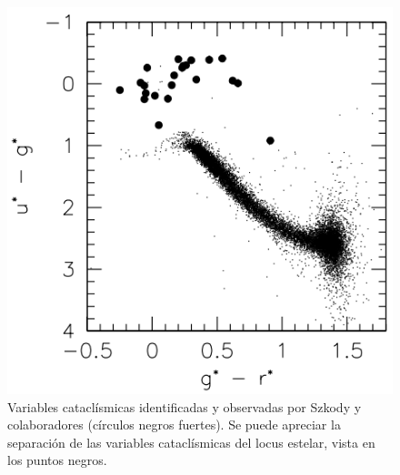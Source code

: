 \begin{figure}[!ht]
	\includegraphics[scale=0.4]{Muestra/Secciones/Figures/ug-gr_Szkody2002.png}

	\caption{Variables cataclísmicas identificadas y observadas por Szkody y
		colaboradores (círculos negros fuertes). Se puede apreciar la separación
		de las variables cataclísmicas del locus estelar, vista en los puntos
		negros. \citet{szkody2002CvSearchSdss}}
	\label{szkody2002ColorColorVCs}
\end{figure}